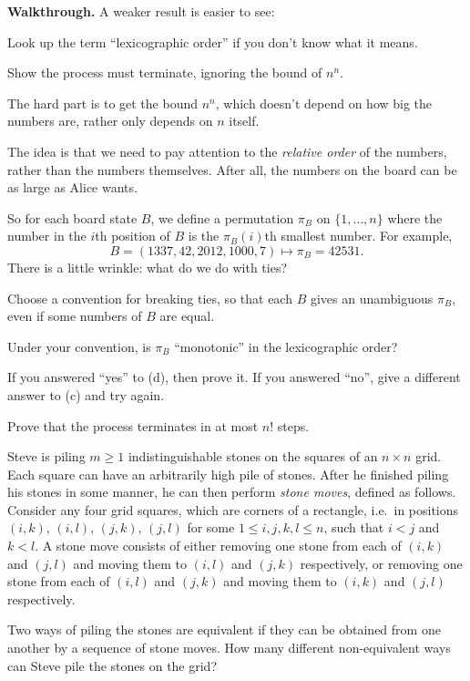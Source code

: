 \documentclass[11pt]{scrartcl}
\providecommand{\ii}{\item}
\providecommand{\printpuid}[1]{\marginpar{\href{https://otis.evanchen.cc/arch/#1}{\ttfamily\footnotesize\color{green!40!black}#1}}}
\newenvironment{walkthrough}{\noindent\textbf{\color{green!40!black}Walkthrough.}}{}
\begin{document}
\begin{walkthrough}
A weaker result is easier to see:
\begin{walk}
  \ii Look up the term ``lexicographic order'' if you don't know what it means.
  \ii Show the process must terminate, ignoring the bound of $n^n$.
\end{walk}
The hard part is to get the bound $n^n$,
which doesn't depend on how big the numbers are,
rather only depends on $n$ itself.

The idea is that we need to pay attention to the \emph{relative order}
of the numbers, rather than the numbers themselves.
After all, the numbers on the board can be as large as Alice wants.

So for each board state $B$,
we define a permutation $\pi_B$ on $\{1,\dots,n\}$
where the number in the $i$th position of $B$
is the $\pi_B(i)$th smallest number. For example,
\[ B = (1337, 42, 2012, 1000, 7)
  \longmapsto \pi_B = 42531. \]
There is a little wrinkle: what do we do with ties?
\begin{walk}[resume]
  \ii Choose a convention for breaking ties, so that each $B$ gives
  an unambiguous $\pi_B$, even if some numbers of $B$ are equal.
  \ii Under your convention, is $\pi_B$ ``monotonic'' in the lexicographic order?
  \ii If you answered ``yes'' to (d), then prove it.
  If you answered ``no'', give a different answer to (c) and try again.
  \ii Prove that the process terminates in at most $n!$ steps.
\end{walk}
\end{walkthrough}

\begin{example*}
  Steve is piling $m\geq 1$ indistinguishable stones
  on the squares of an $n\times n$ grid.
  Each square can have an arbitrarily high pile of stones.
  After he finished piling his stones in some manner,
  he can then perform \emph{stone moves}, defined as follows.
  Consider any four grid squares, which are corners of a rectangle,
  i.e.\ in positions $(i, k)$, $(i, l)$, $(j, k)$, $(j, l)$
  for some $1\leq i, j, k, l\leq n$, such that $i<j$ and $k<l$.
  A stone move consists of either removing one stone from each of
  $(i, k)$ and $(j, l)$ and moving them to $(i, l)$ and $(j, k)$ respectively,
  or removing one stone from each of $(i, l)$ and $(j, k)$
  and moving them to $(i, k)$ and $(j, l)$ respectively.

  Two ways of piling the stones are equivalent if they can be obtained
  from one another by a sequence of stone moves.
  How many different non-equivalent ways can Steve pile the stones on the grid?
\end{example*} \printpuid{15AMO4}
\end{document}
